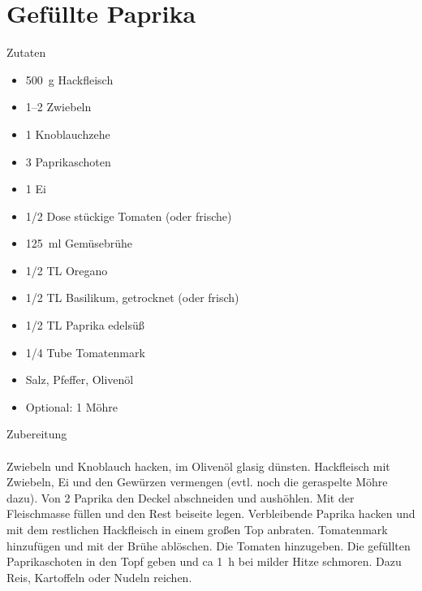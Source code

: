 \section*{Gefüllte Paprika}
\ihead{}\ohead{}
\cfoot{}
{\Large Zutaten}
\begin{multicols}{2}
\begin{itemize}
    \item \SI{500}{g} Hackfleisch
    \item \numrange{1}{2} Zwiebeln
    \item \num{1} Knoblauchzehe
    \item \num{3} Paprikaschoten
    \item \num{1} Ei
    \item \num{1/2} Dose stückige Tomaten (oder frische)
    \item \SI{125}{ml} Gemüsebrühe
    \item \num{1/2} TL Oregano
    \item \num{1/2} TL Basilikum, getrocknet (oder frisch)
    \item \num{1/2} TL Paprika edelsüß
    \item \num{1/4} Tube Tomatenmark
    \item Salz, Pfeffer, Olivenöl
    \item Optional: \num{1} Möhre
\end{itemize}
\end{multicols}
\noindent
{\Large Zubereitung}\\
\\
Zwiebeln und Knoblauch hacken, im Olivenöl glasig dünsten.
Hackfleisch mit Zwiebeln, Ei und den Gewürzen vermengen (evtl. noch die geraspelte Möhre dazu).
Von \num{2} Paprika den Deckel abschneiden und aushöhlen. 
Mit der Fleischmasse füllen und den Rest beiseite legen.
Verbleibende Paprika hacken und mit dem restlichen Hackfleisch in einem großen Top anbraten.
Tomatenmark hinzufügen und mit der Brühe ablöschen.
Die Tomaten hinzugeben.
Die gefüllten Paprikaschoten in den Topf geben und ca \SI{1}{h} bei milder Hitze schmoren.
Dazu Reis, Kartoffeln oder Nudeln reichen.
